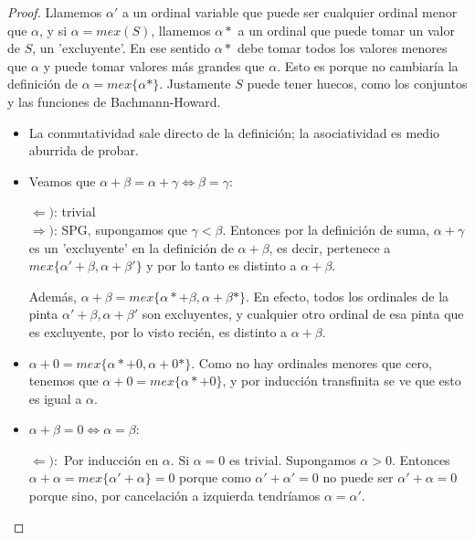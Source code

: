 \documentclass[10pt,a4paper,final]{report}
\def\key#1{\{#1\}}
\begin{document}
\begin{proof}


Llamemos $\alpha'$ a un ordinal variable que puede ser cualquier ordinal menor que $\alpha$, y si $\alpha = mex(S)$, llamemos $\alpha*$ a un ordinal que puede tomar un valor de $S$, un 'excluyente'. En ese sentido $\alpha*$ debe tomar todos los valores menores que $\alpha$ y puede tomar valores más grandes que $\alpha$. Esto es porque no cambiaría la definición de $\alpha = mex\{\alpha*\}$. Justamente $S$ puede tener huecos, como los conjuntos y las funciones de Bachmann-Howard.


\begin{itemize}

\item La conmutatividad sale directo de la definición; la asociatividad es medio aburrida de probar.


\item Veamos que $\alpha + \beta = \alpha + \gamma \Leftrightarrow \beta = \gamma$:

$\Leftarrow)$: trivial\\

$\Rightarrow)$: SPG, supongamos que $\gamma < \beta$. Entonces por la definición de suma, $\alpha + \gamma$ es un 'excluyente' en la definición de $\alpha+\beta$, es decir, pertenece a $mex\{\alpha' + \beta, \alpha + \beta' \}$ y por lo tanto es distinto a $\alpha+\beta$.

Además, $\alpha + \beta = mex\{\alpha* + \beta, \alpha + \beta* \}$. En efecto, todos los ordinales de la pinta $\alpha' + \beta, \alpha + \beta'$ son excluyentes, y cualquier otro ordinal de esa pinta que es excluyente, por lo visto recién, es distinto a $\alpha+\beta$.

\item $\alpha + 0 = mex\{\alpha* + 0, \alpha + 0*\}$. Como no hay ordinales menores que cero, tenemos que $\alpha + 0 = mex\{\alpha* + 0\}$, y por inducción transfinita se ve que esto es igual a $\alpha$.

\item $\alpha + \beta = 0 \Leftrightarrow \alpha = \beta$:

$\Leftarrow): $ Por inducción en $\alpha$. Si $\alpha=0$ es trivial. Supongamos $\alpha>0$. Entonces $\alpha + \alpha = mex\key{\alpha' + \alpha} = 0$ porque como $\alpha'+\alpha'=0$ no puede ser $\alpha'+\alpha = 0$ porque sino, por cancelación a izquierda tendríamos $\alpha = \alpha'$.


\end{itemize}
\end{proof}
\end{document}
